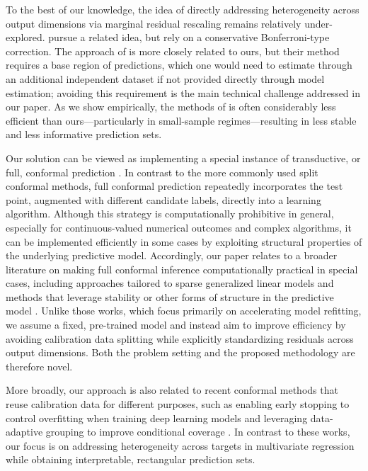 To the best of our knowledge, the idea of directly addressing heterogeneity across output dimensions via marginal residual rescaling remains relatively under-explored. \citet{baheri2025multiscale} pursue a related idea, but rely on a conservative Bonferroni-type correction. {\color{blue}The approach of \citet{sampson2024conformal} is more closely related to ours, but their method requires a base region of predictions, which one would need to estimate through an additional independent dataset if not provided directly through model estimation; avoiding this requirement is the main technical challenge addressed in our paper. As we show empirically, the methods of \citet{sampson2024conformal} is often considerably less efficient than ours—particularly in small-sample regimes—resulting in less stable and less informative prediction sets.}

Our solution can be viewed as implementing a special instance of transductive, or full, conformal prediction \citep{vovk2005algorithmic,vovk2013transductive}. In contrast to the more commonly used split conformal methods, full conformal prediction repeatedly incorporates the test point, augmented with different candidate labels, directly into a learning algorithm. Although this strategy is computationally prohibitive in general, especially for continuous-valued numerical outcomes and complex algorithms, it can be implemented efficiently in some cases by exploiting structural properties of the underlying predictive model. Accordingly, our paper relates to a broader literature on making full conformal inference computationally practical in special cases, including approaches tailored to sparse generalized linear models \citep{lei2019fast,guha2023conformalization} and methods that leverage stability or other forms of structure in the predictive model \citep{ndiaye2019computing, abad2022approximating, martinez2023approximating, li2024generalized}. Unlike those works, which focus primarily on accelerating model refitting, we assume a fixed, pre-trained model and instead aim to improve efficiency by avoiding calibration data splitting while explicitly standardizing residuals across output dimensions. Both the problem setting and the proposed methodology are therefore novel.

More broadly, our approach is also related to recent conformal methods that reuse calibration data for different purposes, such as enabling early stopping to control overfitting when training deep learning models \citep{liang2023conformal} and leveraging data-adaptive grouping to improve conditional coverage \citep{zhou2024conformal, zhang2024posterior}. In contrast to these works, our focus is on addressing heterogeneity across targets in multivariate regression while obtaining interpretable, rectangular prediction sets.


